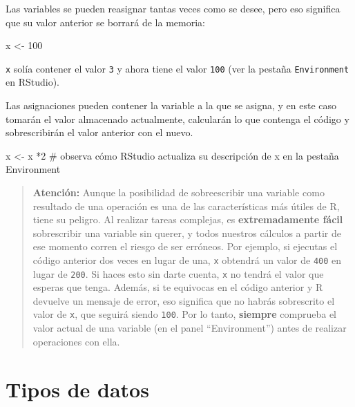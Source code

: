 \documentclass[
  letterpaper,
  DIV=11,
  numbers=noendperiod]{scrreprt}
\newenvironment{Shaded}{\begin{snugshade}}{\end{snugshade}}
\newcommand{\CommentTok}[1]{\textcolor[rgb]{0.37,0.37,0.37}{#1}}
\newcommand{\DecValTok}[1]{\textcolor[rgb]{0.68,0.00,0.00}{#1}}
\newcommand{\NormalTok}[1]{\textcolor[rgb]{0.00,0.23,0.31}{#1}}
\newcommand{\OtherTok}[1]{\textcolor[rgb]{0.00,0.23,0.31}{#1}}
\newcommand{\SpecialCharTok}[1]{\textcolor[rgb]{0.37,0.37,0.37}{#1}}
\begin{document}
Las variables se pueden reasignar tantas veces como se desee, pero eso
significa que su valor anterior se borrará de la memoria:

\begin{Shaded}
\begin{Highlighting}[]
\NormalTok{x }\OtherTok{\textless{}{-}} \DecValTok{100}
\end{Highlighting}
\end{Shaded}

\texttt{x} solía contener el valor \texttt{3} y ahora tiene el valor
\texttt{100} (ver la pestaña \texttt{Environment} en RStudio).

Las asignaciones pueden contener la variable a la que se asigna, y en
este caso tomarán el valor almacenado actualmente, calcularán lo que
contenga el código y sobrescribirán el valor anterior con el nuevo.

\begin{Shaded}
\begin{Highlighting}[]
\NormalTok{x }\OtherTok{\textless{}{-}}\NormalTok{ x }\SpecialCharTok{*}\DecValTok{2} \CommentTok{\# observa cómo RStudio actualiza su descripción de x en la pestaña Environment}
\end{Highlighting}
\end{Shaded}

\begin{quote}
\textbf{Atención:} Aunque la posibilidad de sobreescribir una variable
como resultado de una operación es una de las características más útiles
de R, tiene su peligro. Al realizar tareas complejas, es
\textbf{extremadamente fácil} sobrescribir una variable sin querer, y
todos nuestros cálculos a partir de ese momento corren el riesgo de ser
erróneos. Por ejemplo, si ejecutas el código anterior dos veces en lugar
de una, \texttt{x} obtendrá un valor de \texttt{400} en lugar de
\texttt{200}. Si haces esto sin darte cuenta, \texttt{x} no tendrá el
valor que esperas que tenga. Además, si te equivocas en el código
anterior y R devuelve un mensaje de error, eso significa que no habrás
sobrescrito el valor de \texttt{x}, que seguirá siendo \texttt{100}. Por
lo tanto, \textbf{siempre} comprueba el valor actual de una variable (en
el panel ``Environment'') antes de realizar operaciones con ella.
\end{quote}

\hypertarget{tipos-de-datos}{%
\section{Tipos de datos}\label{tipos-de-datos}}
\end{document}
